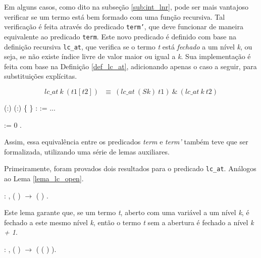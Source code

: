 Em alguns casos, como dito na subseção \ref{sub:int_lnr}, pode ser mais
vantajoso verificar se um termo está bem formado com uma função recursiva.
Tal verificação é feita através do predicado \texttt{term'}, que deve funcionar de
maneira equivalente ao predicado \texttt{term}. Este novo predicado é definido
com base na definição recursiva \texttt{lc\_at}, que verifica se o termo
\emph{t} está \textit{fechado} a um nível \emph{k}, ou seja, se não existe
índice livre de valor maior ou igual a \emph{k}. Sua implementação é feita com
base na Definição \ref{def_lc_at}, adicionando apenas o caso a seguir, para
substituições explícitas.

\[  lc\_at\ k\ (t1[t2])\ \ \ \equiv\ (lc\_at\ (S k)\ t1)\ \&\ (lc\_at\ k\ t2) \]

\bigskip
{}  (:)
(:) \{ \} :
 := ...\coqdoceol

   :=  0 .\coqdoceol
\bigskip

Assim, essa equivalência entre os predicados \emph{term} e \emph{term'} também
teve que ser formalizada, utilizando uma série de lemas auxiliares. 

Primeiramente, foram provados dois resultados para o predicado \texttt{lc\_at}.
Análogos ao Lema \ref{lema_lc_open}.

\bigskip
\coqnoindent {}  :
\coqdockw{\ensuremath{\forall}}  
,  
(   )
\ensuremath{\rightarrow}  ( )
.\coqdoceol

\bigskip

Este lema garante que, se um termo \emph{t}, aberto com uma variável a um
nível \emph{k}, é fechado a este mesmo nível \emph{k}, então o termo \emph{t}
sem a abertura é fechado a nível \emph{k + 1}.

\bigskip

\coqnoindent {}  :
\coqdockw{\ensuremath{\forall}}  
,  (
)  \ensuremath{\rightarrow} 
 (  (
) ).\coqdoceol
\bigskip

